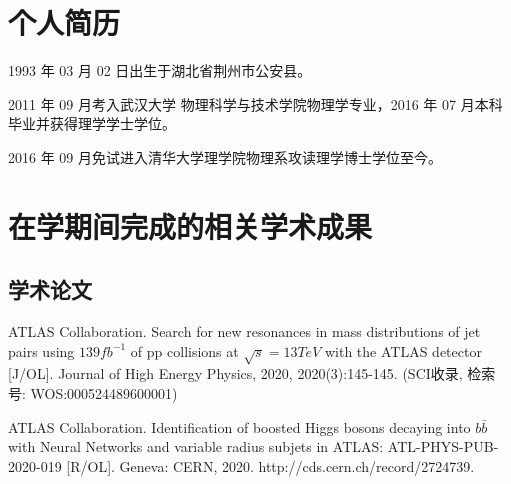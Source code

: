 
\begin{resume}

  \section*{个人简历}

1993 年 03 月 02 日出生于湖北省荆州市公安县。

  2011 年 09 月考入武汉大学 物理科学与技术学院物理学专业，2016 年 07 月本科毕业并获得理学学士学位。

  2016 年 09 月免试进入清华大学理学院物理系攻读理学博士学位至今。


  \section*{在学期间完成的相关学术成果}

  \subsection*{学术论文}

  \begin{achievements}
    \item ATLAS Collaboration. Search for new resonances in mass distributions of jet pairs using $139fb^{-1}$ of pp collisions at $\sqrt{s} = 13 TeV$ with the ATLAS detector [J/OL]. Journal of High Energy Physics, 2020, 2020(3):145-145. (SCI收录, 检索号: WOS:000524489600001)
    \item ATLAS Collaboration. Identification of boosted Higgs bosons decaying into $b\bar{b}$ with Neural Networks and variable radius subjets in ATLAS: ATL-PHYS-PUB-2020-019 [R/OL]. Geneva: CERN, 2020. http://cds.cern.ch/record/2724739.
  
\end{achievements}




\end{resume}
